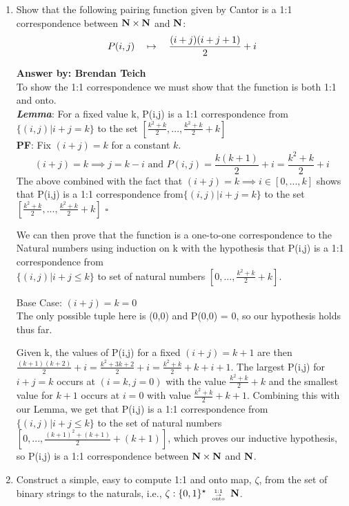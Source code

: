 \documentclass[12pt]{article}
\begin{document}
\noindent{}
\addtocounter{section}{1}

\begin{enumerate}
\item Show that the following pairing function given by Cantor is a 1:1
correspondence between $\mbox{\bf N}\times\mbox{\bf N}$ and $\mbox{\bf N}$:
\[ P(i,j) \quad\mapsto\quad {(i+j)(i+j+1)\over 2} + i\]

{\bf Answer by: Brendan Teich} \\
To show the 1:1 correspondence we must show that the function is both 1:1 and onto. \\
\textit{\textbf{Lemma}}: For a fixed value k, P(i,j) is a 1:1 correspondence from$\{(i,j) | i+j = k\}$ to the set $[\frac{k^2 + k}{2}, ...,  \frac{k^2 + k}{2} + k]$ \\
\textbf{PF}: Fix $(i+j) = k$ for a constant $k$.
\[(i+j) = k \implies j=k-i \text{ and } P(i,j) = \frac{k(k+1)}{2}+ i = \frac{k^2 + k}{2} + i\]
The above combined with the fact that $(i+j) = k \implies i \in [0,..., k]$ shows that  P(i,j) is a 1:1 correspondence from$\{(i,j) | i+j = k\}$ to the set $[\frac{k^2 + k}{2}, ...,  \frac{k^2 + k}{2} + k]$  $\square$

We can then prove that the function is a one-to-one correspondence to the Natural numbers using induction on k with the hypothesis that P(i,j) is a 1:1 correspondence from\\ $\{(i,j) | i+j \leq k\}$ to set of natural numbers $[0 ,..., \frac{k^2 + k}{2} + k]$.  

Base Case: $(i+j)=k=0$ \\
The only possible tuple here is (0,0) and P(0,0) = 0, so our hypothesis holds thus far. 

Given k, the values of P(i,j) for a fixed $(i+j) = k+1$ are then $\frac{(k+1)(k+2)}{2}+ i = \frac{k^2 + 3k + 2}{2} + i = \frac{k^2 + k}{2} + k + i + 1$.
The largest P(i,j) for $i+j=k$ occurs at $(i=k, j=0)$ with the value  $\frac{k^2 + k}{2} + k$ and the smallest value for $k+1$ occurs at $i=0$ with value $\frac{k^2 + k}{2} + k + 1$. Combining this with our Lemma, we get that P(i,j) is a 1:1 correspondence from $\{(i,j) | i+j \leq k\}$ to the set of natural numbers $[0,...,  \frac{(k+1)^2 + (k+1)}{2} + (k+1)]$, which proves our inductive hypothesis, so P(i,j) is a 1:1 correspondence between $\mbox{\bf N}\times\mbox{\bf N}$ and $\mbox{\bf N}$.

\item Construct a simple, easy to compute 1:1 and onto map, $\zeta$, from the set of binary strings
  to the naturals, i.e., $\zeta: \set{0,1}^\star\bijection\N$.


\end{enumerate}
\end{document}
